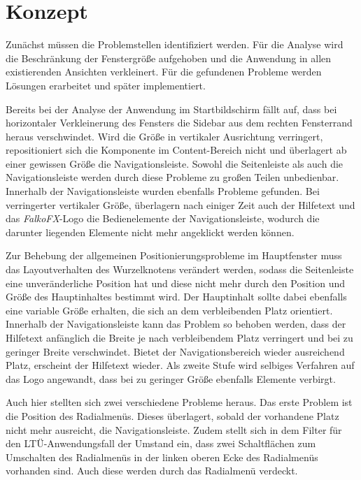 \section{Konzept} \label{sec:responsiveConcept}
Zunächst müssen die Problemstellen identifiziert werden. Für die Analyse wird die Beschränkung der Fenstergröße aufgehoben und die Anwendung in allen existierenden Ansichten verkleinert. Für die gefundenen Probleme werden Lösungen erarbeitet und später implementiert.\par
{}
Bereits bei der Analyse der Anwendung im Startbildschirm fällt auf, dass bei horizontaler Verkleinerung des Fensters die Sidebar aus dem rechten Fensterrand heraus verschwindet. Wird die Größe in vertikaler Ausrichtung verringert, repositioniert sich die Komponente im Content-Bereich nicht und überlagert ab einer gewissen Größe die Navigationsleiste. Sowohl die Seitenleiste als auch die Navigationsleiste werden durch diese Probleme zu großen Teilen unbedienbar. Innerhalb der Navigationsleiste wurden ebenfalls Probleme gefunden. Bei verringerter vertikaler Größe, überlagern nach einiger Zeit auch der Hilfetext und das \textit{FalkoFX}-Logo die Bedienelemente der Navigationsleiste, wodurch die darunter liegenden Elemente nicht mehr angeklickt werden können.\par
Zur Behebung der allgemeinen Positionierungsprobleme im Hauptfenster muss das Layoutverhalten des Wurzelknotens verändert werden, sodass die Seitenleiste eine unveränderliche Position hat und diese nicht mehr durch den Position und Größe des Hauptinhaltes bestimmt wird. Der Hauptinhalt sollte dabei ebenfalls eine variable Größe erhalten, die sich an dem verbleibenden Platz orientiert. Innerhalb der Navigationsleiste kann das Problem so behoben werden, dass der Hilfetext anfänglich die Breite je nach verbleibendem Platz verringert und bei zu geringer Breite verschwindet. Bietet der Navigationsbereich wieder ausreichend Platz, erscheint der Hilfetext wieder. Als zweite Stufe wird selbiges Verfahren auf das Logo angewandt, dass bei zu geringer Größe ebenfalls Elemente verbirgt.\par
{}
Auch hier stellten sich zwei verschiedene Probleme heraus. Das erste Problem ist die Position des Radialmenüs. Dieses überlagert, sobald der vorhandene Platz nicht mehr ausreicht, die Navigationsleiste. Zudem stellt sich in dem Filter für den LTÜ-Anwendungsfall der Umstand ein, dass zwei Schaltflächen zum Umschalten des Radialmenüs in der linken oberen Ecke des Radialmenüs vorhanden sind. Auch diese werden durch das Radialmenü verdeckt.\par
